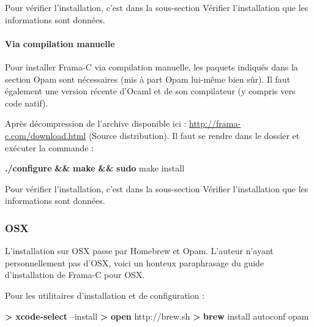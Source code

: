 \documentclass[12pt,francais,]{scrbook}
\newenvironment{Shaded}{}{}
\newcommand{\KeywordTok}[1]{\textcolor[rgb]{0.00,0.44,0.13}{\textbf{{#1}}}}
\newcommand{\NormalTok}[1]{{#1}}
\begin{document}
Pour vérifier l'installation, c'est dans la sous-section \og{}Vérifier
l'installation\fg{} que les informations sont données.

\paragraph{\texorpdfstring{Via compilation
\og{}manuelle\fg{}}{Via compilation manuelle}}\label{via-compilation-manuelle}

Pour installer Frama-C via compilation manuelle, les paquets indiqués
dans la section Opam sont nécessaires (mis à part Opam lui-même bien
sûr). Il faut également une version récente d'Ocaml et de son
compilateur (y compris vers code natif).

Après décompression de l'archive disponible ici :
\url{http://frama-c.com/download.html} (Source distribution). Il faut se
rendre dans le dossier et exécuter la commande :

\begin{footnotesize}\begin{Shaded}
\begin{Highlighting}[]
\KeywordTok{./configure} \KeywordTok{&&} \KeywordTok{make} \KeywordTok{&&} \KeywordTok{sudo} \NormalTok{make install}
\end{Highlighting}
\end{Shaded}\end{footnotesize}

Pour vérifier l'installation, c'est dans la sous-section \og{}Vérifier
l'installation\fg{} que les informations sont données.

\subsubsection{OSX}\label{osx}

L'installation sur OSX passe par Homebrew et Opam. L'auteur n'ayant
personnellement pas d'OSX, voici un honteux paraphrasage du guide
d'installation de Frama-C pour OSX.

Pour les utilitaires d'installation et de configuration :

\begin{footnotesize}\begin{Shaded}
\begin{Highlighting}[]
\KeywordTok{>} \KeywordTok{xcode-select} \NormalTok{--install }
\KeywordTok{>} \KeywordTok{open} \NormalTok{http://brew.sh}
\KeywordTok{>} \KeywordTok{brew} \NormalTok{install autoconf opam }
\end{Highlighting}
\end{Shaded}\end{footnotesize}
\end{document}
